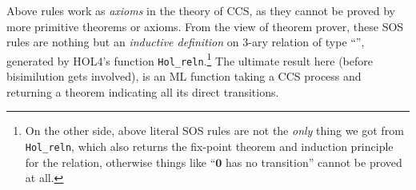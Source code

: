 Above rules work as \emph{axioms} in the theory of CCS, as they cannot be
proved by more primitive theorems or axioms. From the view of theorem prover, these
SOS rules are nothing but an \emph{inductive 
  definition} on 3-ary relation  of type ``'', generated by HOL4's function
\texttt{Hol_reln}.\footnote{On the other side, above literal SOS rules are not
the \emph{only} thing we got from \texttt{Hol_reln}, which also
returns the fix-point theorem and induction principle for the
relation, otherwise things like ``$\textbf{0}$ has no transition''
cannot be proved at all.} The ultimate result here (before
bisimilution gets involved), is an ML function taking a CCS process
and returning a theorem indicating all its direct transitions.

